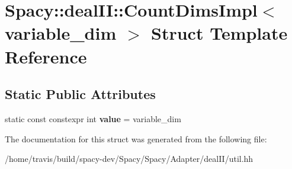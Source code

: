 \hypertarget{structSpacy_1_1dealII_1_1CountDimsImpl_3_01variable__dim_01_4}{\section{Spacy\-:\-:deal\-I\-I\-:\-:Count\-Dims\-Impl$<$ variable\-\_\-dim $>$ Struct Template Reference}
\label{structSpacy_1_1dealII_1_1CountDimsImpl_3_01variable__dim_01_4}
}
\subsection*{Static Public Attributes}
\begin{DoxyCompactItemize}
\item 
\hypertarget{structSpacy_1_1dealII_1_1CountDimsImpl_3_01variable__dim_01_4_a0e95579aedd3a6000691f71972dfdcb4}{static const constexpr int {\bfseries value} = variable\-\_\-dim}\label{structSpacy_1_1dealII_1_1CountDimsImpl_3_01variable__dim_01_4_a0e95579aedd3a6000691f71972dfdcb4}

\end{DoxyCompactItemize}


The documentation for this struct was generated from the following file\-:\begin{DoxyCompactItemize}
\item 
/home/travis/build/spacy-\/dev/\-Spacy/\-Spacy/\-Adapter/deal\-I\-I/util.\-hh\end{DoxyCompactItemize}
